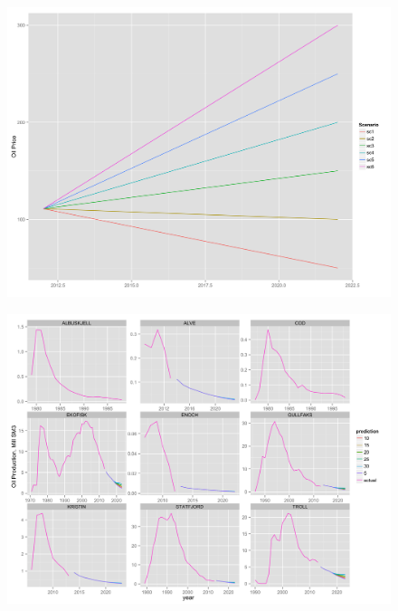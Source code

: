 \documentclass{beamer}
\begin{document}
\begin{frame}[plain]
	\begin{figure}
		\includegraphics[width=.8\textwidth]{figures/price_scenario.png}
		
		\label{price_scenario}
	\end{figure}
\end{frame}

\begin{frame}[plain]
	\begin{figure}
		\includegraphics[width=.8\textwidth]{figures/field_lev_forecast.png}		
		\label{field_lev_forecast}
	\end{figure}

\end{frame}
\end{document}
